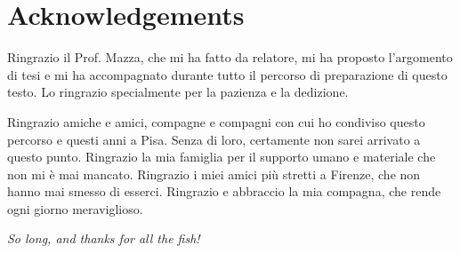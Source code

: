 \chapter*{Acknowledgements}

Ringrazio il Prof. Mazza, che mi ha fatto da relatore, mi ha proposto l'argomento di tesi e mi ha accompagnato durante tutto il percorso di preparazione di questo testo. Lo ringrazio specialmente per la pazienza e la dedizione.

Ringrazio amiche e amici, compagne e compagni con cui ho condiviso questo percorso e questi anni a Pisa. Senza di loro, certamente non sarei arrivato a questo punto. Ringrazio la mia famiglia per il supporto umano e materiale che non mi è mai mancato. Ringrazio i miei amici più stretti a Firenze, che non hanno mai smesso di esserci. Ringrazio e abbraccio la mia compagna, che rende ogni giorno meraviglioso.

%
%
%

\vfill
\begin{flushright}
	\emph{So long, and thanks for all the fish!} \\
	\citeauthor{adams2009hitchhikers} \cite{adams2009hitchhikers}
\end{flushright}
